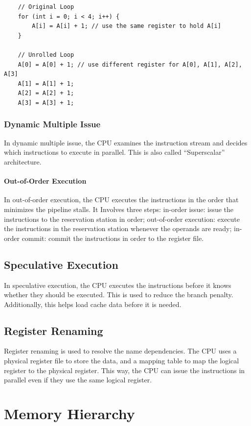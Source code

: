 \documentclass[a4paper,12pt]{article}
\begin{document}
\begin{verbatim}
	// Original Loop
	for (int i = 0; i < 4; i++) {
	    A[i] = A[i] + 1; // use the same register to hold A[i]
	}

	// Unrolled Loop
	A[0] = A[0] + 1; // use different register for A[0], A[1], A[2], A[3]
	A[1] = A[1] + 1;
	A[2] = A[2] + 1;
	A[3] = A[3] + 1;
\end{verbatim}

\subsubsection{Dynamic Multiple Issue}

In dynamic multiple issue, the CPU examines the instruction stream and decides which instructions to execute in parallel. This is also called ``Superscalar'' architecture.

\paragraph{Out-of-Order Execution} In out-of-order execution, the CPU executes the instructions in the order that minimizes the pipeline stalls. It Involves three steps: in-order issue: issue the instructions to the reservation station in order; out-of-order execution: execute the instructions in the reservation station whenever the operands are ready; in-order commit: commit the instructions in order to the register file.

\subsection{Speculative Execution}

In speculative execution, the CPU executes the instructions before it knows whether they should be executed. This is used to reduce the branch penalty. Additionally, this helps load cache data before it is needed.

\subsection{Register Renaming}

Register renaming is used to resolve the name dependencies. The CPU uses a physical register file to store the data, and a mapping table to map the logical register to the physical register. This way, the CPU can issue the instructions in parallel even if they use the same logical register.

\section{Memory Hierarchy}
\end{document}
